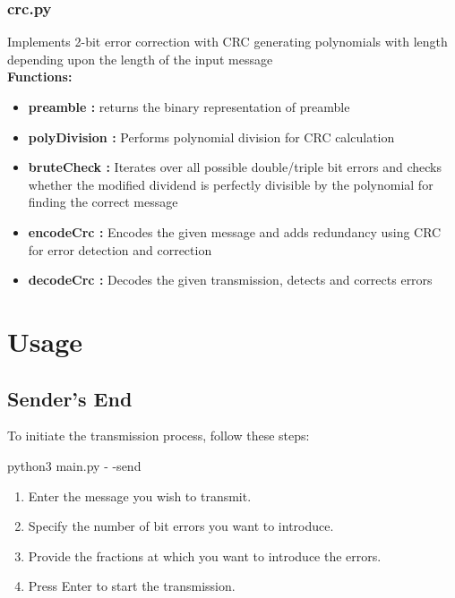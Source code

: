 \documentclass[11pt]{article}
\begin{document}
\subsubsection*{crc.py}
Implements 2-bit error correction with CRC generating polynomials with length depending upon the length of the input message\\
\textbf{Functions:}\vspace{-0.25cm}
\begin{itemize}\setlength\itemsep{-0.1cm}
    \item \textbf{preamble :} returns the binary representation of preamble
    \item \textbf{polyDivision :} Performs polynomial division for CRC calculation
    \item \textbf{bruteCheck :} Iterates over all possible double/triple bit errors and checks whether the modified dividend is perfectly divisible by the polynomial for finding the correct message
    \item \textbf{encodeCrc :} Encodes the given message and adds redundancy using CRC for error detection and correction
    \item \textbf{decodeCrc :} Decodes the given transmission, detects and corrects errors
\end{itemize}
\section{Usage}

\subsection*{Sender's End}

To initiate the transmission process, follow these steps:

\begin{tcolorbox}
    python3 main.py - \hspace{-0.1cm}-send
\end{tcolorbox}

\begin{enumerate}
    \item Enter the message you wish to transmit.
    \item Specify the number of bit errors you want to introduce.
    \item Provide the fractions at which you want to introduce the errors.
    \item Press Enter to start the transmission.
\end{enumerate}
\end{document}
